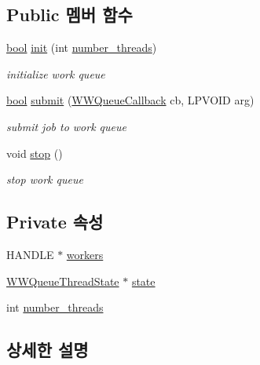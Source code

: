 \subsection*{Public 멤버 함수}
\begin{DoxyCompactItemize}
\item 
\hyperlink{avb__gptp_8h_af6a258d8f3ee5206d682d799316314b1}{bool} \hyperlink{class_windows_work_queue_ac57e22c9dab08570f94ae0144cf7fcef}{init} (int \hyperlink{class_windows_work_queue_a18728b09e371bfac7bd1f64bdcda3de4}{number\+\_\+threads})
\begin{DoxyCompactList}\small\item\em initialize work queue \end{DoxyCompactList}\item 
\hyperlink{avb__gptp_8h_af6a258d8f3ee5206d682d799316314b1}{bool} \hyperlink{class_windows_work_queue_af0c02e876f9edca58e4230cad25b98fe}{submit} (\hyperlink{work__queue_8hpp_af69b92fbf5afe098f578d0cce8298f84}{W\+W\+Queue\+Callback} cb, L\+P\+V\+O\+ID arg)
\begin{DoxyCompactList}\small\item\em submit job to work queue \end{DoxyCompactList}\item 
void \hyperlink{class_windows_work_queue_a8c528baf37154d347366083f0f816846}{stop} ()
\begin{DoxyCompactList}\small\item\em stop work queue \end{DoxyCompactList}\end{DoxyCompactItemize}
\subsection*{Private 속성}
\begin{DoxyCompactItemize}
\item 
H\+A\+N\+D\+LE $\ast$ \hyperlink{class_windows_work_queue_a9cbdd44e71a21ed9af56a4442c340768}{workers}
\item 
\hyperlink{struct_w_w_queue_thread_state}{W\+W\+Queue\+Thread\+State} $\ast$ \hyperlink{class_windows_work_queue_abf6b506f47e806311cc2a0788607d127}{state}
\item 
int \hyperlink{class_windows_work_queue_a18728b09e371bfac7bd1f64bdcda3de4}{number\+\_\+threads}
\end{DoxyCompactItemize}


\subsection{상세한 설명}


